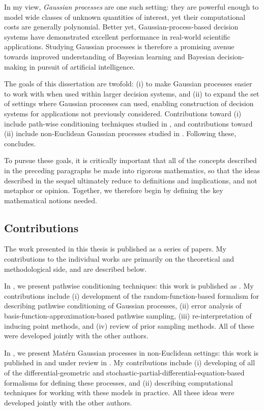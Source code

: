\documentclass[11pt]{book}
\begin{document}
In my view, \emph{Gaussian processes} are one such setting: they are powerful enough to model wide classes of unknown quantities of interest, yet their computational costs are generally polynomial.
Better yet, Gaussian-process-based decision systems have demonstrated excellent performance in real-world scientific applications.
Studying Gaussian processes is therefore a promising avenue towards improved understanding of Bayesian learning and Bayesian decision-making in pursuit of artificial intelligence.

The goals of this dissertation are twofold: (i) to make Gaussian processes easier to work with when used within larger decision systems, and (ii) to expand the set of settings where Gaussian processes can used, enabling construction of decision systems for applications not previously considered.
Contributions toward (i) include path-wise conditioning techniques studied in , and contributions toward (ii) include non-Euclidean Gaussian processes studied in .
Following these,  concludes.

To pursue these goals, it is critically important that all of the concepts described in the preceding paragraphs be made into rigorous mathematics, so that the ideas described in the sequel ultimately reduce to definitions and implications, and not metaphor or opinion.
Together, we therefore begin by defining the key mathematical notions needed.

\subsection*{Contributions}

The work presented in this thesis is published as a series of papers.
My contributions to the individual works are primarily on the theoretical and methodological side, and are described below.

In , we present pathwise conditioning techniques: this work is published as \textcite{wilson20,wilson21}.
My contributions include (i) development of the random-function-based formalism for describing pathwise conditioning of Gaussian processes, (ii) error analysis of basis-function-approximation-based pathwise sampling, (iii) re-interpretation of inducing point methods, and (iv) review of prior sampling methods.
All of these were developed jointly with the other authors. 

In , we present Matérn Gaussian processes in non-Euclidean settings: this work is published in \textcite{borovitskiy20,borovitskiy21,jacquier21} and under review in \textcite{hutchinson21}.
My contributions include (i) developing of all of the differential-geometric and stochastic-partial-differential-equation-based formalisms for defining these processes, and (ii) describing computational techniques for working with these models in practice.
All these ideas were developed jointly with the other authors.
\end{document}
